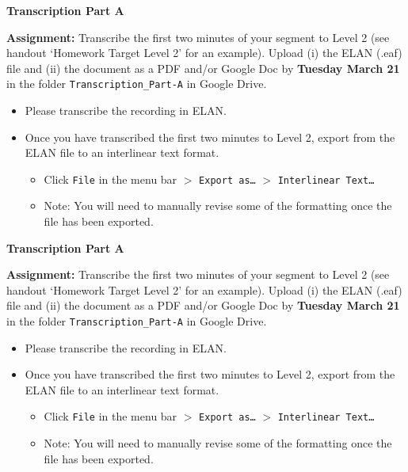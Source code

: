 \documentclass{article}
\begin{document}
\begin{center}
  \textbf{Transcription Part A}
\end{center}

\noindent\textbf{Assignment:} Transcribe the first two minutes of your segment to Level 2 (see handout `Homework Target Level 2' for an example). Upload (i) the ELAN (.eaf) file and (ii) the document as a PDF and/or Google Doc by \textbf{Tuesday March 21} in the folder \texttt{Transcription\_Part-A} in Google Drive.

\begin{itemize}
  \item Please transcribe the recording in ELAN.
  \item Once you have transcribed the first two minutes to Level 2, export from the ELAN file to an interlinear text format. 
  \begin{itemize}
    \item Click \texttt{File} in the menu bar $>$ \texttt{Export as\ldots} $>$ \texttt{Interlinear Text\ldots}
    \item Note: You will need to manually revise some of the formatting once the file has been exported.
  \end{itemize}
\end{itemize}

\vfill

\begin{center}
  \textbf{Transcription Part A}
\end{center}

\noindent\textbf{Assignment:} Transcribe the first two minutes of your segment to Level 2 (see handout `Homework Target Level 2' for an example). Upload (i) the ELAN (.eaf) file and (ii) the document as a PDF and/or Google Doc by \textbf{Tuesday March 21} in the folder \texttt{Transcription\_Part-A} in Google Drive.

\begin{itemize}
  \item Please transcribe the recording in ELAN.
  \item Once you have transcribed the first two minutes to Level 2, export from the ELAN file to an interlinear text format. 
  \begin{itemize}
    \item Click \texttt{File} in the menu bar $>$ \texttt{Export as\ldots} $>$ \texttt{Interlinear Text\ldots}
    \item Note: You will need to manually revise some of the formatting once the file has been exported.
  \end{itemize}
\end{itemize}
\end{document}
